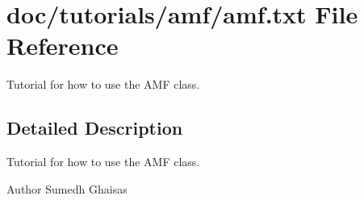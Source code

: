 \section{doc/tutorials/amf/amf.txt File Reference}
\label{amf_8txt}


Tutorial for how to use the A\+MF class.  




\subsection{Detailed Description}
Tutorial for how to use the A\+MF class. 

\begin{DoxyAuthor}{Author}
Sumedh Ghaisas 
\end{DoxyAuthor}
